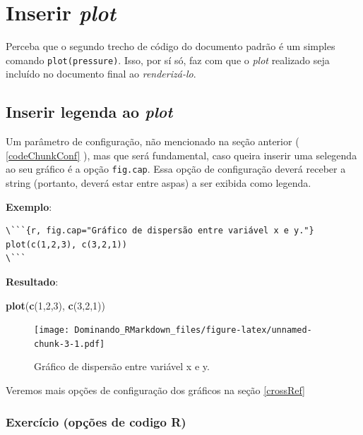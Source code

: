 \documentclass[]{book}
\newenvironment{Shaded}{\begin{snugshade}}{\end{snugshade}}
\newcommand{\DecValTok}[1]{\textcolor[rgb]{0.00,0.00,0.81}{#1}}
\newcommand{\KeywordTok}[1]{\textcolor[rgb]{0.13,0.29,0.53}{\textbf{#1}}}
\newcommand{\NormalTok}[1]{#1}
\begin{document}
\hypertarget{InserirPlot}{%
\chapter{\texorpdfstring{Inserir \emph{plot}}{Inserir plot}}\label{InserirPlot}}

Perceba que o segundo trecho de código do documento padrão é um simples comando \texttt{plot(pressure)}. Isso, por sí só, faz com que o \emph{plot} realizado seja incluído no documento final ao \emph{renderizá-lo}.

\hypertarget{InserirLegendaPlot}{%
\section{\texorpdfstring{Inserir legenda ao \emph{plot}}{Inserir legenda ao plot}}\label{InserirLegendaPlot}}

Um parâmetro de configuração, não mencionado na seção anterior ( \ref{codeChunkConf} ), mas que será fundamental, caso queira inserir uma selegenda ao seu gráfico é a opção \texttt{fig.cap}. Essa opção de configuração deverá receber a string (portanto, deverá estar entre aspas) a ser exibida como legenda.

\textbf{Exemplo}:

\begin{verbatim}
\```{r, fig.cap="Gráfico de dispersão entre variável x e y."}
plot(c(1,2,3), c(3,2,1))
\```
\end{verbatim}

\textbf{Resultado}:

\begin{Shaded}
\begin{Highlighting}[]
\KeywordTok{plot}\NormalTok{(}\KeywordTok{c}\NormalTok{(}\DecValTok{1}\NormalTok{,}\DecValTok{2}\NormalTok{,}\DecValTok{3}\NormalTok{), }\KeywordTok{c}\NormalTok{(}\DecValTok{3}\NormalTok{,}\DecValTok{2}\NormalTok{,}\DecValTok{1}\NormalTok{))}
\end{Highlighting}
\end{Shaded}

\begin{figure}
\centering
\texttt{[image: Dominando\_RMarkdown\_files/figure-latex/unnamed-chunk-3-1.pdf]}
\caption{\label{fig:unnamed-chunk-3}Gráfico de dispersão entre variável x e y.}
\end{figure}

Veremos mais opções de configuração dos gráficos na seção \ref{crossRef}

\hypertarget{exercuxedcio-opuxe7uxf5es-de-codigo-r}{%
\subsection{Exercício (opções de codigo R)}\label{exercuxedcio-opuxe7uxf5es-de-codigo-r}}
\end{document}
